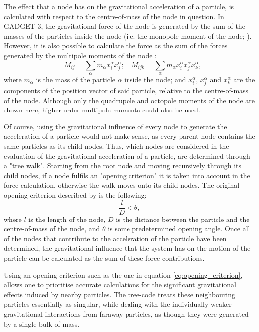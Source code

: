 \documentclass[english, twoside]{HYgradu}
\begin{document}
The effect that a node has on the gravitational acceleration of a particle, is calculated with respect to the centre-of-mass of the node in question. In GADGET-3, the gravitational force of the node is generated by the sum of the masses of the particles inside the node (i.e. the monopole moment of the node; \citealt{Springel2005}). However, it is also possible to calculate the force as the sum of the forces generated by the multipole moments of the node \citep{BinneyTremaine}:
\begin{equation}
\quad M_{ij} = \displaystyle\sum_\alpha m_\alpha x^\alpha_i x^\alpha_j; \quad M_{ijk} = \displaystyle\sum_\alpha m_\alpha x^\alpha_i x^\alpha_j x^\alpha_k,
\end{equation}
where $m_\alpha$ is the mass of the particle $\alpha$ inside the node; and $x_i^\alpha$, $x_j^\alpha$ and $x_k^\alpha$ are the components of the position vector of said particle, relative to the centre-of-mass of the node. Although only the quadrupole and octopole moments of the node are shown here, higher order multipole moments could also be used.

Of course, using the gravitational influence of every node to generate the acceleration of a particle would not make sense, as every parent node contains the same particles as its child nodes. Thus, which nodes are considered in the evaluation of the gravitational acceleration of a particle, are determined through a "tree walk". Starting from the root node and moving recursively through its child nodes, if a node fulfils an "opening criterion" it is taken into account in the force calculation, otherwise the walk moves onto its child nodes. The original opening criterion described by \cite{Barnes1986} is the following:
\begin{equation}
\frac{l}{D} < \theta, \label{eq:opening_criterion}
\end{equation}
where $l$ is the length of the node, $D$ is the distance between the particle and the centre-of-mass of the node, and $\theta$ is some predetermined opening angle. Once all of the nodes that contribute to the acceleration of the particle have been determined, the gravitational influence that the system has on the motion of the particle can be calculated as the sum of these force contributions. 

Using an opening criterion such as the one in equation \ref{eq:opening_criterion}, allows one to prioritise accurate calculations for the significant gravitational effects induced by nearby particles. The tree-code treats these neighbouring particles essentially as singular, while dealing with the individually weaker gravitational interactions from faraway particles, as though they were generated by a single bulk of mass. 
\end{document}
